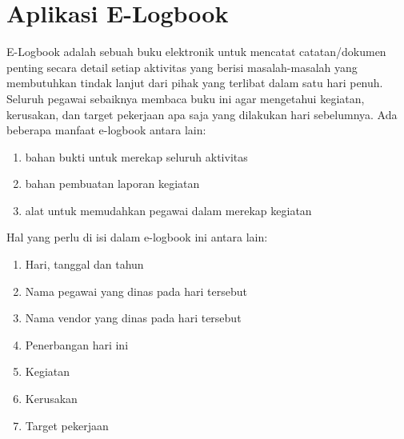 \section{Aplikasi E-Logbook}
E-Logbook adalah sebuah buku elektronik untuk mencatat catatan/dokumen penting secara detail setiap aktivitas yang berisi masalah-masalah yang membutuhkan tindak lanjut dari pihak yang terlibat dalam satu hari penuh. Seluruh pegawai sebaiknya membaca buku ini agar mengetahui kegiatan, kerusakan, dan target pekerjaan apa saja yang dilakukan hari sebelumnya. Ada beberapa manfaat e-logbook antara lain:
\begin{enumerate}
\item bahan bukti untuk merekap seluruh aktivitas
\item bahan pembuatan laporan kegiatan
\item alat untuk memudahkan pegawai dalam merekap kegiatan
 \end{enumerate}

Hal yang perlu di isi dalam e-logbook ini antara lain:
\begin{enumerate}
\item Hari, tanggal dan tahun
\item Nama pegawai yang dinas pada hari tersebut
\item Nama vendor yang dinas pada hari tersebut
\item Penerbangan hari ini
\item Kegiatan
\item Kerusakan
\item Target pekerjaan
\end{enumerate}

